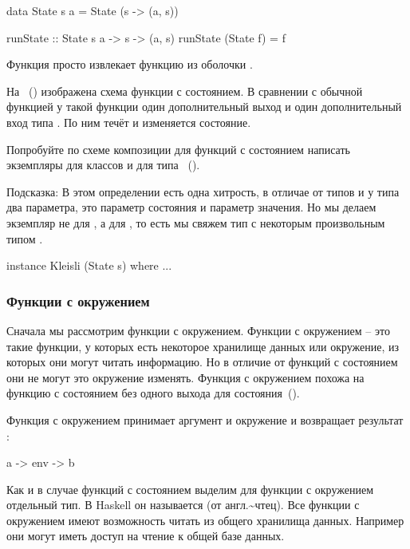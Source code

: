 \begin{code}
data State s a = State (s -> (a, s))

runState :: State s a -> s -> (a, s)
runState (State f) = f
\end{code}


Функция  просто извлекает функцию из оболочки .

На ~() изображена схема функции с состоянием. В сравнении
с обычной функцией у такой функции один дополнительный выход и один
дополнительный вход типа . По ним течёт и изменяется состояние.

Попробуйте по схеме композиции для функций с состоянием написать
экземпляры для классов  и  для типа
~().

Подсказка: В этом определении есть одна хитрость, в отличае от типов
 и \In{[a]} у типа  два параметра, это параметр
состояния и параметр значения. Но мы делаем экземпляр не для ,
а для , то есть мы свяжем тип с некоторым произвольным типом
.


\begin{code}
instance Kleisli (State s) where
	...
\end{code}

\subsubsection{Функции с окружением}

 Сначала мы рассмотрим функции с
окружением. Функции с окружением -- это такие функции, у которых есть
некоторое хранилище данных или окружение, из которых они могут читать
информацию. Но в отличие от функций с состоянием они не могут это
окружение изменять. Функция с окружением похожа на функцию с состоянием
без одного выхода для состояния~().


Функция с окружением принимает аргумент  и окружение  и
возвращает результат :


\begin{code}
a -> env -> b
\end{code}

Как и в случае функций с состоянием выделим для функции с окружением
отдельный тип. В Haskell он называется  (от
англ.\textasciitilde{}чтец). Все функции с окружением имеют возможность
читать из общего хранилища данных. Например они могут иметь доступ на
чтение к общей базе данных.


